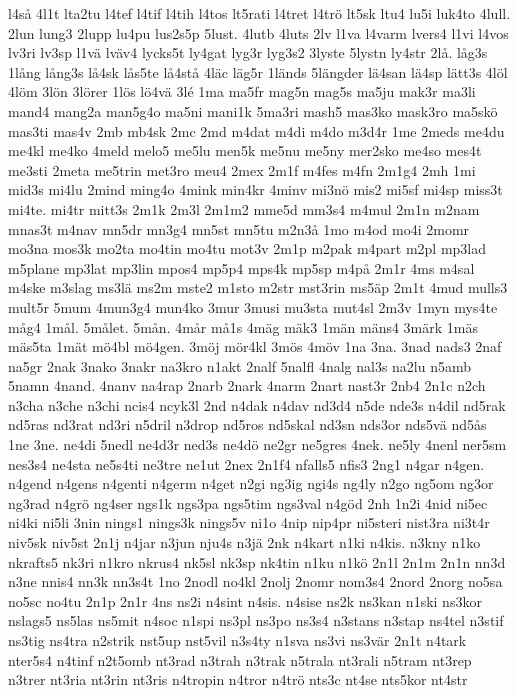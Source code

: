 {l4så
4l1t
lta2tu
l4tef
l4tif
l4tih
l4tos
lt5rati
l4tret
l4trö
lt5sk
ltu4
lu5i
luk4to
4lull.
2lun
lung3
2lupp
lu4pu
lus2s5p
5lust.
4lutb
4luts
2lv
l1va
l4varm
lvers4
l1vi
l4vos
lv3ri
lv3sp
l1vä
lväv4
lycks5t
ly4gat
lyg3r
lyg3s2
3lyste
5lystn
ly4str
2lå.
låg3s
1lång
lång3s
lå4sk
lås5te
lå4stå
4läc
läg5r
1länds
5längder
lä4san
lä4sp
lätt3s
4löl
4löm
3lön
3lörer
1lös
lö4vä
3lé
1ma
ma5fr
mag5n
mag5s
ma5ju
mak3r
ma3li
mand4
mang2a
man5g4o
ma5ni
mani1k
5ma3ri
mash5
mas3ko
mask3ro
ma5skö
mas3ti
mas4v
2mb
mb4sk
2mc
2md
m4dat
m4di
m4do
m3d4r
1me
2meds
me4du
me4kl
me4ko
4meld
melo5
me5lu
men5k
me5nu
me5ny
mer2sko
me4so
mes4t
me3sti
2meta
me5trin
met3ro
meu4
2mex
2m1f
m4fes
m4fn
2m1g4
2mh
1mi
mid3s
mi4lu
2mind
ming4o
4mink
min4kr
4minv
mi3nö
mis2
mi5sf
mi4sp
miss3t
mi4te.
mi4tr
mitt3s
2m1k
2m3l
2m1m2
mme5d
mm3s4
m4mul
2m1n
m2nam
mnas3t
m4nav
mn5dr
mn3g4
mn5st
mn5tu
m2n3å
1mo
m4od
mo4i
2momr
mo3na
mos3k
mo2ta
mo4tin
mo4tu
mot3v
2m1p
m2pak
m4part
m2pl
mp3lad
m5plane
mp3lat
mp3lin
mpos4
mp5p4
mps4k
mp5sp
m4på
2m1r
4ms
m4sal
m4ske
m3slag
ms3lä
ms2m
mste2
m1sto
m2str
mst3rin
ms5äp
2m1t
4mud
mulls3
mult5r
5mum
4mun3g4
mun4ko
3mur
3musi
mu3sta
mut4sl
2m3v
1myn
mys4te
måg4
1mål.
5målet.
5mån.
4mår
må1s
4mäg
mäk3
1män
mäns4
3märk
1mäs
mäs5ta
1mät
mö4bl
mö4gen.
3möj
mör4kl
3mös
4möv
1na
3na.
3nad
nads3
2naf
na5gr
2nak
3nako
3nakr
na3kro
n1akt
2nalf
5nalfl
4nalg
nal3s
na2lu
n5amb
5namn
4nand.
4nanv
na4rap
2narb
2nark
4narm
2nart
nast3r
2nb4
2n1c
n2ch
n3cha
n3che
n3chi
ncis4
ncyk3l
2nd
n4dak
n4dav
nd3d4
n5de
nde3s
n4dil
nd5rak
nd5ras
nd3rat
nd3ri
n5dril
n3drop
nd5ros
nd5skal
nd3sn
nds3or
nds5vä
nd5ås
1ne
3ne.
ne4di
5nedl
ne4d3r
ned3s
ne4dö
ne2gr
ne5gres
4nek.
ne5ly
4nenl
ner5sm
nes3s4
ne4sta
ne5s4ti
ne3tre
ne1ut
2nex
2n1f4
nfalls5
nfis3
2ng1
n4gar
n4gen.
n4gend
n4gens
n4genti
n4germ
n4get
n2gi
ng3ig
ngi4s
ng4ly
n2go
ng5om
ng3or
ng3rad
n4grö
ng4ser
ngs1k
ngs3pa
ngs5tim
ngs3val
n4göd
2nh
1n2i
4nid
ni5ec
ni4ki
ni5li
3nin
nings1
nings3k
nings5v
ni1o
4nip
nip4pr
ni5steri
nist3ra
ni3t4r
niv5sk
niv5st
2n1j
n4jar
n3jun
nju4s
n3jä
2nk
n4kart
n1ki
n4kis.
n3kny
n1ko
nkrafts5
nk3ri
n1kro
nkrus4
nk5sl
nk3sp
nk4tin
n1ku
n1kö
2n1l
2n1m
2n1n
nn3d
n3ne
nnis4
nn3k
nn3s4t
1no
2nodl
no4kl
2nolj
2nomr
nom3s4
2nord
2norg
no5sa
no5sc
no4tu
2n1p
2n1r
4ns
ns2i
n4sint
n4sis.
n4sise
ns2k
ns3kan
n1ski
ns3kor
nslags5
ns5las
ns5mit
n4soc
n1spi
ns3pl
ns3po
ns3s4
n3stans
n3stap
ns4tel
n3stif
ns3tig
ns4tra
n2strik
nst5up
nst5vil
n3s4ty
n1sva
ns3vi
ns3vär
2n1t
n4tark
nter5s4
n4tinf
n2t5omb
nt3rad
n3trah
n3trak
n5trala
nt3rali
n5tram
nt3rep
n3trer
nt3ria
nt3rin
nt3ris
n4tropin
n4tror
n4trö
nts3c
nt4se
nts5kor
nt4str
}
